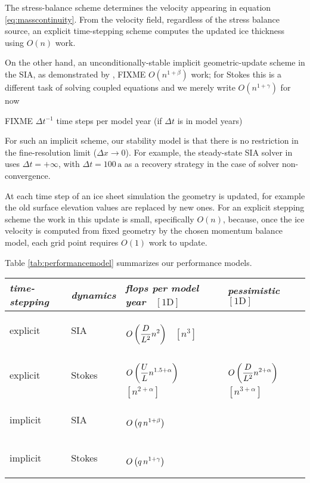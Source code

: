 \documentclass[twocolumn,letterpaper]{igs}
\begin{document}
The stress-balance scheme determines the velocity appearing in equation \eqref{eq:masscontinuity}.  From the velocity field, regardless of the stress balance source, an explicit time-stepping scheme computes the updated ice thickness using $O(n)$ work.

On the other hand, an unconditionally-stable implicit geometric-update scheme in the SIA, as demonstrated by \cite{Bueler2016}, FIXME $O(n^{1+\beta})$ work; for Stokes this is a different task of solving coupled equations and we merely write $O(n^{1+\gamma})$ for now

FIXME $\Delta t^{-1}$ time steps per model year (if $\Delta t$ is in model years)

For such an implicit scheme, our stability model is that there is no restriction in the fine-resolution limit ($\Delta x \to 0$).  For example, the steady-state SIA solver in \cite{Bueler2016} uses $\Delta t=+\infty$, with $\Delta t = 100 \,\text{a}$ as a recovery strategy in the case of solver non-convergence.

At each time step of an ice sheet simulation the geometry is updated, for example the old surface elevation values are replaced by new ones.  For an explicit stepping scheme the work in this update is small, specifically $O(n)$, because, once the ice velocity is computed from fixed geometry by the chosen momentum balance model, each grid point requires $O(1)$ work to update.

Table \ref{tab:performancemodel} summarizes our performance models.

\newcommand{\oo}[1]{{\LARGE \strut} \displaystyle O\left(#1\right)}
\setlength{\tabcolsep}{5pt}
\renewcommand{\arraystretch}{1.5}
\begin{table*}[ht]
\begin{tabular}{llll}
\emph{time-stepping} & \emph{dynamics} & \emph{flops per model year \, $\left[\text{1D}\right]$} & \emph{pessimistic \, $\left[\text{1D}\right]$} \\ \hline
explicit & SIA    & $\oo{\frac{D}{L^2} n^2}$ \, $\left[n^3\right]$ \\
explicit & Stokes & $\oo{\frac{U}{L} n^{1.5+\alpha}}$ \, $\left[n^{2+\alpha}\right]$ & $\oo{\frac{D}{L^2} n^{2+\alpha}}$ \, $\left[n^{3+\alpha}\right]$ \\
implicit & SIA    & $\oo{q\, n^{1+\beta}}$ \\
implicit & Stokes & $\oo{q\, n^{1+\gamma}}$
\end{tabular}
\caption{Asymptotic scaling of computational work, floating point operations per model year, for time-stepping numerical ice sheet simulations, as the degrees of freedom $n$ goes to infinity.  Note 1D refers to flow-line geometry; corrected power on $n$ for 1D is in square brackets.  See Table \ref{tab:notation} for remaining notation.}
\label{tab:performancemodel}
\end{table*}
\end{document}

